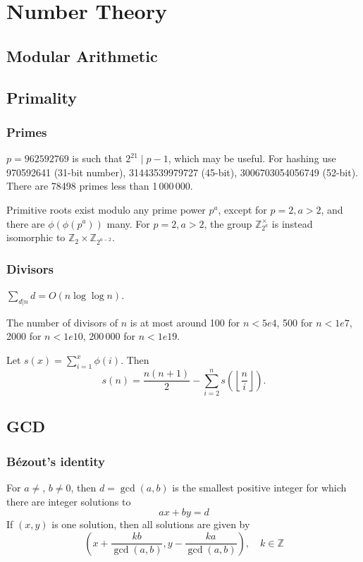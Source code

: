 \chapter{Number Theory}

\section{Modular Arithmetic}

\section{Primality}
	\subsection{Primes}
	$p=962592769$ is such that $2^{21} \mid p-1$, which may be useful. For hashing
	use 970592641 (31-bit number), 31443539979727 (45-bit), 3006703054056749
	(52-bit). There are 78498 primes less than 1\,000\,000.

	Primitive roots exist modulo any prime power $p^a$, except for $p = 2, a > 2$, and there are $\phi(\phi(p^a))$ many.
	For $p = 2, a > 2$, the group $\mathbb Z_{2^a}^\times$ is instead isomorphic to $\mathbb Z_2 \times \mathbb Z_{2^{a-2}}$.

	\subsection{Divisors}
	$\sum_{d|n} d = O(n \log \log n)$.

	The number of divisors of $n$ is at most around 100 for $n < 5e4$, 500 for $n < 1e7$, 2000 for $n < 1e10$, 200\,000 for $n < 1e19$.

	Let $s(x)=\sum_{i=1}^x\phi(i).$ Then 
	$$s(n)=\frac{n(n+1)}{2}-\sum_{i=2}^ns\left(\left\lfloor\frac{n}{i}\right\rfloor\right).$$


\section{GCD}
	\subsection{Bézout's identity}
	For $a \neq $, $b \neq 0$, then $d=\gcd(a,b)$ is the smallest positive integer for which there are integer solutions to
	$$ax+by=d$$
	If $(x,y)$ is one solution, then all solutions are given by
	$$\left(x+\frac{kb}{\gcd(a,b)}, y-\frac{ka}{\gcd(a,b)}\right), \quad k\in\mathbb{Z}$$

